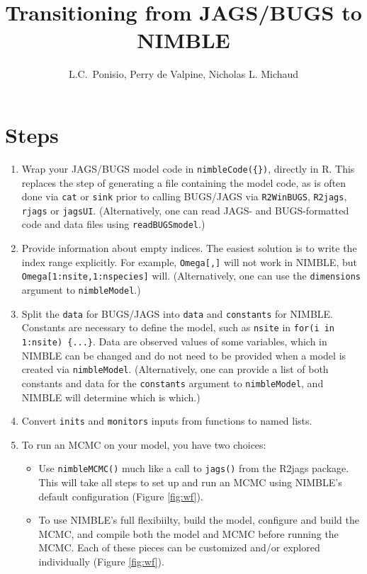 \documentclass[12pt]{article}
\title{Transitioning from JAGS/BUGS to NIMBLE}
\author{L.C.~Ponisio, Perry de Valpine, Nicholas L. Michaud}
\def\code#1{\texttt{#1}}
\begin{document}
\maketitle

\section{Steps}
\begin{enumerate}
\item Wrap your
  JAGS/BUGS model code in \code{nimbleCode(\{\})}, directly in R. This
  replaces the step of generating a file containing the model code, as
  is often done
  via \code{cat} or \code{sink} prior to calling BUGS/JAGS
  via \code{R2WinBUGS}, \code{R2jags},
  \code{rjags} or \code{jagsUI}.  (Alternatively, one can read
  JAGS- and BUGS-formatted code and data files using
  \code{readBUGSmodel}.)
\item Provide information about empty indices.  The easiest solution
  is to write the index range explicitly. For example, \code{Omega[,]} will not work in NIMBLE, but
  \code{Omega[1:nsite,1:nspecies]} will.  (Alternatively, one can use
  the \code{dimensions} argument to \code{nimbleModel}.)
\item Split the \code{data} for BUGS/JAGS into \code{data} and
  \code{constants} for NIMBLE.  Constants are necessary to define the
  model, such as \code{nsite} in \code{for(i in 1:nsite) \{...\}}.  Data are
  observed values of some variables, which in NIMBLE can be changed
  and do not need to be provided when a model is created via
  \code{nimbleModel}.  (Alternatively, one can provide a list of both
  constants and data for the \code{constants} argument to
  \code{nimbleModel}, and NIMBLE will determine which is which.)
\item Convert \code{inits} and \code{monitors} inputs from functions to named lists.
\item To run an MCMC on your model, you have two choices:
  \begin{itemize}
  \item Use \code{nimbleMCMC()} much like a call to
  \code{jags()} from the R2jags package.  This will take all steps to
  set up and run an MCMC using
   NIMBLE's default configuration (Figure \ref{fig:wf}). 
 \item To use NIMBLE's full flexibiilty, build the model, configure
   and build the MCMC, and compile both the model and MCMC before
   running the MCMC. Each of
   these pieces can be customized
  and/or explored individually (Figure \ref{fig:wf}).
  \end{itemize}
\end{enumerate}
\end{document}
